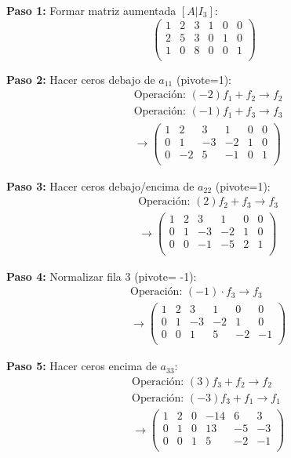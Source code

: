 \begin{myproof}
\textbf{Paso 1:} Formar matriz aumentada \([A|I_3]\):
\[
\left(\begin{array}{ccc|ccc}
1 & 2 & 3 & 1 & 0 & 0 \\
2 & 5 & 3 & 0 & 1 & 0 \\
1 & 0 & 8 & 0 & 0 & 1 \\
\end{array}\right)
\]

\textbf{Paso 2:} Hacer ceros debajo de \(a_{11}\) (pivote=1):
\begin{align*}
& \text{Operación: } (-2)f_1 + f_2 \to f_2 \\
& \text{Operación: } (-1)f_1 + f_3 \to f_3 \\
& \rightarrow \left(\begin{array}{ccc|ccc}
\boxed{1} & 2 & 3 & 1 & 0 & 0 \\
0 & 1 & -3 & -2 & 1 & 0 \\
0 & -2 & 5 & -1 & 0 & 1 \\
\end{array}\right)
\end{align*}

\textbf{Paso 3:} Hacer ceros debajo/encima de \(a_{22}\) (pivote=1):
\begin{align*}
& \text{Operación: } (2)f_2 + f_3 \to f_3 \\
& \rightarrow \left(\begin{array}{ccc|ccc}
1 & 2 & 3 & 1 & 0 & 0 \\
0 & \boxed{1} & -3 & -2 & 1 & 0 \\
0 & 0 & -1 & -5 & 2 & 1 \\
\end{array}\right)
\end{align*}

\textbf{Paso 4:} Normalizar fila 3 (pivote= -1):
\begin{align*}
& \text{Operación: } (-1) \cdot f_3 \to f_3 \\
& \rightarrow \left(\begin{array}{ccc|ccc}
1 & 2 & 3 & 1 & 0 & 0 \\
0 & 1 & -3 & -2 & 1 & 0 \\
0 & 0 & \boxed{1} & 5 & -2 & -1 \\
\end{array}\right)
\end{align*}

\textbf{Paso 5:} Hacer ceros encima de \(a_{33}\):
\begin{align*}
& \text{Operación: } (3)f_3 + f_2 \to f_2 \\
& \text{Operación: } (-3)f_3 + f_1 \to f_1 \\
& \rightarrow \left(\begin{array}{ccc|ccc}
1 & 2 & 0 & -14 & 6 & 3 \\
0 & 1 & 0 & 13 & -5 & -3 \\
0 & 0 & 1 & 5 & -2 & -1 \\
\end{array}\right)
\end{align*}


\end{myproof}
